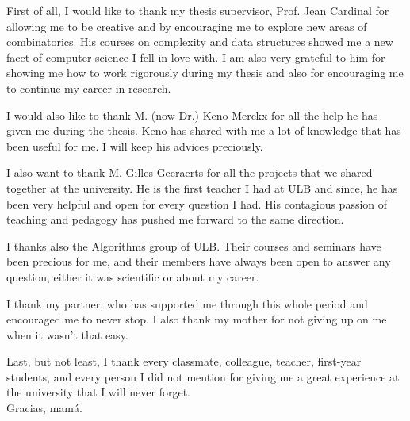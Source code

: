\documentclass[12pt,a4paper,oneside]{book}
\theoremstyle{definition}
\theoremstyle{remark}
\theoremstyle{plain}
\numberwithin{theorem}{section}
\begin{document}
\noindent First of all, I would like to thank my thesis supervisor, Prof. Jean Cardinal for allowing me to be creative and by encouraging me to explore new areas of combinatorics. His courses on complexity and data structures showed me a new facet of computer science I fell in love with. I am also very grateful to him for showing me how to work rigorously during my thesis and also for encouraging me to continue my career in research.

I would also like to thank M. (now Dr.) Keno Merckx for all the help he has given me during the thesis. Keno has shared with me a lot of knowledge that has been useful for me. I will keep his advices preciously.

I also want to thank M. Gilles Geeraerts for all the projects that we shared together at the university. He is the first teacher I had at ULB and since, he has been very helpful and open for every question I had. His contagious passion of teaching and pedagogy has pushed me forward to the same direction.

I thanks also the Algorithms group of ULB. Their courses and seminars have been precious for me, and their members have always been open to answer any question, either it was scientific or about my career.

I thank my partner, who has supported me through this whole period and encouraged me to never stop. I also thank my mother for not giving up on me when it wasn't that easy.

Last, but not least, I thank every classmate, colleague, teacher, first-year students, and every person I did not mention for giving me a great experience at the university that I will never forget.\\

Gracias, mamá.

\thispagestyle{empty}
\setcounter{page}{0}
\tableofcontents
\mainmatter
\setcounter{page}{1}














\backmatter




\end{document}

